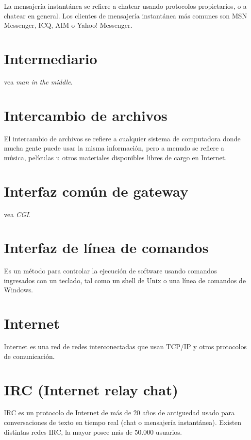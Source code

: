 \documentclass[10pt,a5paper,twoside,,]{book}
\begin{document}
La mensajería instantánea se refiere a chatear usando protocolos
propietarios, o a chatear en general. Los clientes de mensajería
instantánea más comunes son MSN Messenger, ICQ, AIM o Yahoo! Messenger.

\section{Intermediario}\label{intermediario}

vea \emph{man in the middle}.

\section{Intercambio de archivos}\label{intercambio-de-archivos}

El intercambio de archivos se refiere a cualquier sistema de computadora
donde mucha gente puede usar la misma información, pero a menudo se
refiere a música, películas u otros materiales disponibles libres de
cargo en Internet.

\section{Interfaz común de gateway}\label{interfaz-comuxfan-de-gateway}

vea \emph{CGI}.

\section{Interfaz de línea de
comandos}\label{interfaz-de-luxednea-de-comandos}

Es un método para controlar la ejecución de software usando comandos
ingresados con un teclado, tal como un shell de Unix o una línea de
comandos de Windows.

\section{Internet}\label{internet}

Internet es una red de redes interconectadas que usan TCP/IP y otros
protocolos de comunicación.

\section{IRC (Internet relay chat)}\label{irc-internet-relay-chat}

IRC es un protocolo de Internet de más de 20 años de antiguedad usado
para conversaciones de texto en tiempo real (chat o mensajería
instantánea). Existen distintas redes IRC, la mayor posee más de 50.000
usuarios.
\end{document}
